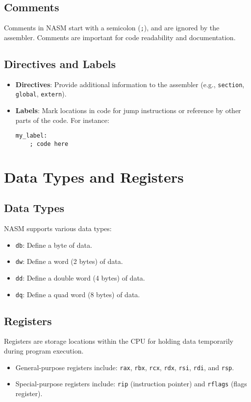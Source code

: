 \documentclass{article}
\begin{document}
\subsection{Comments}
Comments in NASM start with a semicolon (\texttt{;}), and are ignored by the assembler. Comments are important for code readability and documentation.

\subsection{Directives and Labels}
\begin{itemize}
    \item \textbf{Directives}: Provide additional information to the assembler (e.g., \texttt{section}, \texttt{global}, \texttt{extern}).
    \item \textbf{Labels}: Mark locations in code for jump instructions or reference by other parts of the code. For instance:
    \begin{lstlisting}
my_label:
    ; code here
    \end{lstlisting}
\end{itemize}

\section{Data Types and Registers}

\subsection{Data Types}
NASM supports various data types:
\begin{itemize}
    \item \texttt{db}: Define a byte of data.
    \item \texttt{dw}: Define a word (2 bytes) of data.
    \item \texttt{dd}: Define a double word (4 bytes) of data.
    \item \texttt{dq}: Define a quad word (8 bytes) of data.
\end{itemize}

\subsection{Registers}
Registers are storage locations within the CPU for holding data temporarily during program execution.
\begin{itemize}
    \item General-purpose registers include: \texttt{rax}, \texttt{rbx}, \texttt{rcx}, \texttt{rdx}, \texttt{rsi}, \texttt{rdi}, and \texttt{rsp}.
    \item Special-purpose registers include: \texttt{rip} (instruction pointer) and \texttt{rflags} (flags register).
\end{itemize}
\end{document}
